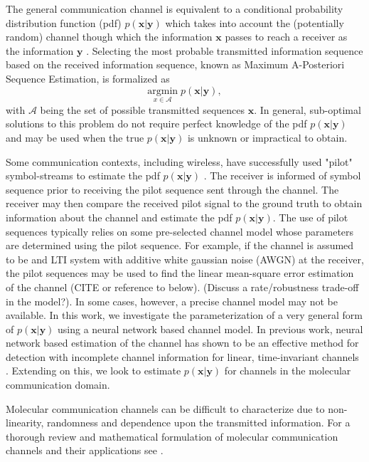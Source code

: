 \documentclass[12pt,a4paper]{report}
\begin{document}
\par
The general communication channel is equivalent to a conditional probability distribution function (pdf) $p(\mathbf{x}|\mathbf{y})$ which takes into account the (potentially random) channel though which the information $\mathbf{x}$ passes to reach a receiver as the information $\mathbf{y}$ \cite[Ch.~7]{cover2012elements}. Selecting the most probable transmitted information sequence based on the received information sequence, known as Maximum A-Posteriori Sequence Estimation, is formalized as
\begin{equation*}
\underset{x\in\mathcal{A}}{\text{argmin}} \; p(\mathbf{x}|\mathbf{y}),
\end{equation*} with $\mathcal{A}$ being the set of possible transmitted sequences $\mathbf{x}$. In general, sub-optimal solutions to this problem do not require perfect knowledge of the pdf $p(\mathbf{x}|\mathbf{y})$ and may be used when the true $p(\mathbf{x}|\mathbf{y})$ is unknown or impractical to obtain.

\par
Some communication contexts, including wireless, have successfully used "pilot" symbol-streams to estimate the pdf $p(\mathbf{x}|\mathbf{y})$ \cite{van1995channel}. The receiver is informed of symbol sequence prior to receiving the pilot sequence sent through the channel. The receiver may then compare the received pilot signal to the ground truth to obtain information about the channel and estimate the pdf $p(\mathbf{x}|\mathbf{y})$.
The use of pilot sequences typically relies on some pre-selected channel model whose parameters are determined using the pilot sequence. For example, if the channel is assumed to be and LTI system with additive white gaussian noise (AWGN) at the receiver, the pilot sequences may be used to find the linear mean-square error estimation of the channel (CITE or reference to below). (Discuss a rate/robustness trade-off in the model?). In some cases, however, a precise channel model may not be available. In this work, we investigate the parameterization of a very general form of $p(\mathbf{x}|\mathbf{y})$ using a neural network based channel model. In previous work, neural network based estimation of the channel has shown to be an effective method for detection with incomplete channel information for linear, time-invariant channels \cite{shlezinger2019viterbinet} \cite{shlezinger2020datadriven}.
 Extending on this, we look to estimate $p(\mathbf{x}|\mathbf{y})$ for channels in the molecular communication domain.
\par
Molecular communication channels can be difficult to characterize due to non-linearity, randomness and dependence upon the transmitted information. For a thorough review and mathematical formulation of molecular communication channels and their applications see \cite{jamali2019channel}. 
\end{document}
